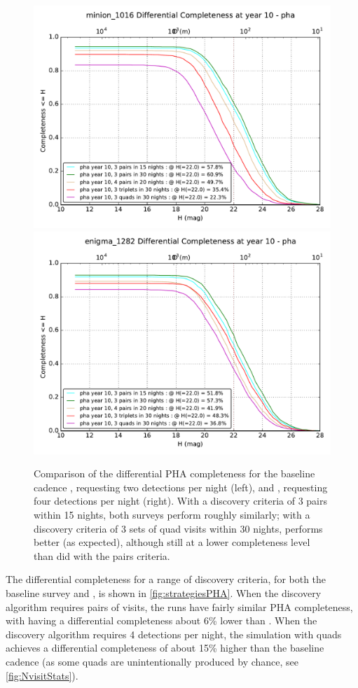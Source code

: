 \begin{figure}[bh]
\includegraphics[angle=0,width=0.49\hsize:,clip]{figs/solarsystem/minion_1016_Completeness_3_15_pairs_3_30_pairs_quads_3_30_3_30_triplets_pairs_20_4_nights_in_pha_year_10_MOOB_ComboMetricVsH}
\includegraphics[angle=0,width=0.49\hsize:,clip]{figs/solarsystem/enigma_1282_Completeness_3_15_pairs_3_30_pairs_quads_3_30_3_30_triplets_pairs_20_4_nights_in_pha_year_10_MOOB_ComboMetricVsH}
\caption{%
Comparison of the differential PHA completeness for the baseline cadence
, requesting two detections per night (left), and
, requesting four detections per
night (right). With a discovery criteria of 3 pairs within 15 nights,
both surveys perform roughly similarly; with a discovery criteria of 3
sets of quad visits within 30 nights,
 performs better (as expected),
although still at a lower completeness level than
 did with the pairs criteria.}
\label{fig:strategiesPHA}
\end{figure}

The differential completeness for a range of discovery criteria, for
both the baseline survey and , is
shown in \autoref{fig:strategiesPHA}. When the discovery algorithm
requires pairs of visits, the runs have fairly similar PHA
completeness, with  having a
differential completeness about 6\% lower than
.  When the discovery algorithm requires 4
detections per night, the simulation with quads achieves a
differential completeness of about 15\% higher than the baseline
cadence (as some quads are unintentionally produced by chance, see
\autoref{fig:NvisitStats}).

